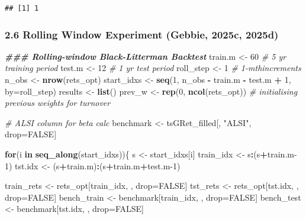 \documentclass[
  12pt,
]{article}
\newenvironment{Shaded}{\begin{snugshade}}{\end{snugshade}}
\newcommand{\AttributeTok}[1]{\textcolor[rgb]{0.13,0.29,0.53}{#1}}
\newcommand{\CommentTok}[1]{\textcolor[rgb]{0.56,0.35,0.01}{\textit{#1}}}
\newcommand{\ConstantTok}[1]{\textcolor[rgb]{0.56,0.35,0.01}{#1}}
\newcommand{\ControlFlowTok}[1]{\textcolor[rgb]{0.13,0.29,0.53}{\textbf{#1}}}
\newcommand{\DecValTok}[1]{\textcolor[rgb]{0.00,0.00,0.81}{#1}}
\newcommand{\DocumentationTok}[1]{\textcolor[rgb]{0.56,0.35,0.01}{\textbf{\textit{#1}}}}
\newcommand{\FunctionTok}[1]{\textcolor[rgb]{0.13,0.29,0.53}{\textbf{#1}}}
\newcommand{\NormalTok}[1]{#1}
\newcommand{\OtherTok}[1]{\textcolor[rgb]{0.56,0.35,0.01}{#1}}
\newcommand{\SpecialCharTok}[1]{\textcolor[rgb]{0.81,0.36,0.00}{\textbf{#1}}}
\newcommand{\StringTok}[1]{\textcolor[rgb]{0.31,0.60,0.02}{#1}}
\begin{document}
\begin{verbatim}
## [1] 1
\end{verbatim}

\subsubsection{2.6 Rolling Window Experiment (Gebbie, 2025c,
2025d)}\label{rolling-window-experiment-tim_btmlx-tim_prep}

\begin{Shaded}
\begin{Highlighting}[]
\DocumentationTok{\#\#\# Rolling{-}window Black{-}Litterman Backtest }
\NormalTok{train.m }\OtherTok{\textless{}{-}} \DecValTok{60}  \CommentTok{\# 5 yr training period}
\NormalTok{test.m  }\OtherTok{\textless{}{-}} \DecValTok{12}  \CommentTok{\# 1 yr test period}
\NormalTok{roll\_step }\OtherTok{\textless{}{-}} \DecValTok{1} \CommentTok{\# 1{-}mthincrements}
\NormalTok{n\_obs }\OtherTok{\textless{}{-}} \FunctionTok{nrow}\NormalTok{(rets\_opt)}
\NormalTok{start\_idxs }\OtherTok{\textless{}{-}} \FunctionTok{seq}\NormalTok{(}\DecValTok{1}\NormalTok{, n\_obs }\SpecialCharTok{{-}}\NormalTok{ train.m }\SpecialCharTok{{-}}\NormalTok{ test.m }\SpecialCharTok{+} \DecValTok{1}\NormalTok{, }\AttributeTok{by=}\NormalTok{roll\_step)}
\NormalTok{results }\OtherTok{\textless{}{-}} \FunctionTok{list}\NormalTok{()}
\NormalTok{prev\_w }\OtherTok{\textless{}{-}} \FunctionTok{rep}\NormalTok{(}\DecValTok{0}\NormalTok{, }\FunctionTok{ncol}\NormalTok{(rets\_opt)) }\CommentTok{\# initialising previous weights for turnover}

\CommentTok{\# ALSI column for beta calc}
\NormalTok{benchmark }\OtherTok{\textless{}{-}}\NormalTok{ tsGRet\_filled[, }\StringTok{"ALSI"}\NormalTok{, drop}\OtherTok{=}\ConstantTok{FALSE}\NormalTok{]}

\ControlFlowTok{for}\NormalTok{(i }\ControlFlowTok{in} \FunctionTok{seq\_along}\NormalTok{(start\_idxs))\{}
\NormalTok{  s }\OtherTok{\textless{}{-}}\NormalTok{ start\_idxs[i]}
\NormalTok{  train\_idx }\OtherTok{\textless{}{-}}\NormalTok{ s}\SpecialCharTok{:}\NormalTok{(s}\SpecialCharTok{+}\NormalTok{train.m}\DecValTok{{-}1}\NormalTok{)}
\NormalTok{  tst.idx   }\OtherTok{\textless{}{-}}\NormalTok{ (s}\SpecialCharTok{+}\NormalTok{train.m)}\SpecialCharTok{:}\NormalTok{(s}\SpecialCharTok{+}\NormalTok{train.m}\SpecialCharTok{+}\NormalTok{test.m}\DecValTok{{-}1}\NormalTok{)}
  
\NormalTok{  train\_rets }\OtherTok{\textless{}{-}}\NormalTok{ rets\_opt[train\_idx, , drop}\OtherTok{=}\ConstantTok{FALSE}\NormalTok{]}
\NormalTok{  tst\_rets   }\OtherTok{\textless{}{-}}\NormalTok{ rets\_opt[tst.idx, , drop}\OtherTok{=}\ConstantTok{FALSE}\NormalTok{]}
\NormalTok{  bench\_train }\OtherTok{\textless{}{-}}\NormalTok{ benchmark[train\_idx, , drop}\OtherTok{=}\ConstantTok{FALSE}\NormalTok{]}
\NormalTok{  bench\_test  }\OtherTok{\textless{}{-}}\NormalTok{ benchmark[tst.idx, , drop}\OtherTok{=}\ConstantTok{FALSE}\NormalTok{]}
  

\end{Highlighting}
\end{Shaded}
\end{document}
